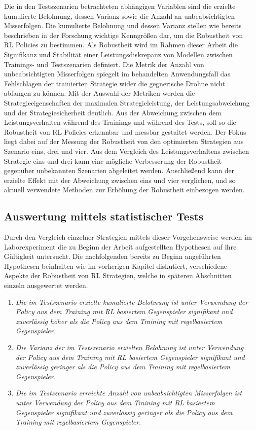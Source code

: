 Die in den Testszenarien betrachteten abhängigen Variablen sind die erzielte kumulierte Belohnung, dessen Varianz sowie die Anzahl an unbeabsichtigten Misserfolgen.
Die kumulierte Belohnung und dessen Varianz stellen wie bereits beschrieben in der Forschung wichtige Kenngrößen dar, um die Robustheit von RL Policies zu bestimmen.
Als Robustheit wird im Rahmen dieser Arbeit die Signifikanz und Stabilität einer Leistungsdiskrepanz von Modellen zwischen Trainings- und Testszenarien definiert.
Die Metrik der Anzahl von unbeabsichtigten Misserfolgen spiegelt im behandelten Anwendungsfall das Fehlschlagen der trainierten Strategie wider die gegnerische Drohne nicht abfangen zu können.
Mit der Auswahl der Metriken werden die Strategieeigenschaften der maximalen Strategieleistung, der Leistungsabweichung und der Strategiesicherheit deutlich.
Aus der Abweichung zwischen dem Leistungsverhalten während des Trainings und während des Tests, soll so die Robustheit von RL Policies erkennbar und messbar gestaltet werden.
Der Fokus liegt dabei auf der Messung der Robustheit von den optimierten Strategien aus Szenario eins, drei und vier.
Aus dem Vergleich des Leistungsverhaltens zwischen Strategie eins und drei kann eine mögliche Verbesserung der Robustheit gegenüber unbekannten Szenarien abgeleitet werden.
Anschließend kann der erzielte Effekt mit der Abweichung zwischen eins und vier verglichen, und so aktuell verwendete Methoden zur Erhöhung der Robustheit einbezogen werden.

\subsection{Auswertung mittels statistischer Tests}

Durch den Vergleich einzelner Strategien mittels dieser Vorgehensweise werden im Laborexperiment die zu Beginn der Arbeit aufgestellten Hypothesen auf ihre Gültigkeit untersucht.
Die nachfolgenden bereits zu Beginn angeführten Hypothesen beinhalten wie im vorherigen Kapitel diskutiert, verschiedene Aspekte der Robustheit von RL Strategien, welche in späteren Abschnitten einzeln ausgewertet werden.
\begin{enumerate}
    \item \textit{Die im Testszenario erzielte kumulierte Belohnung ist unter Verwendung der Policy aus dem Training mit RL basiertem Gegenspieler signifikant und zuverlässig höher als die Policy aus dem Training mit regelbasiertem Gegenspieler.}
    \item \textit{Die Varianz der im Testszenario erzielten Belohnung ist unter Verwendung der Policy aus dem Training mit RL basiertem Gegenspieler signifikant und zuverlässig geringer als die Policy aus dem Training mit regelbasiertem Gegenspieler.}
    \item \textit{Die im Testszenario erreichte Anzahl von unbeabsichtigten Misserfolgen ist unter Verwendung der Policy aus dem Training mit RL basiertem Gegenspieler signifikant und zuverlässig geringer als die Policy aus dem Training mit regelbasiertem Gegenspieler.}
\end{enumerate}

